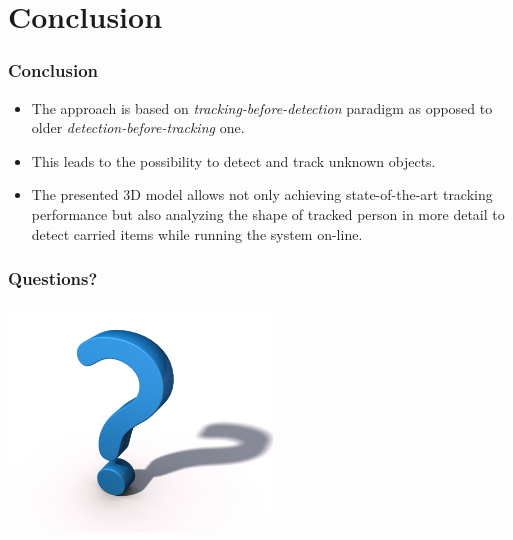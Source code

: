 \documentclass{beamer}
\begin{document}
\section{Conclusion}
\begin{frame}
\frametitle{Conclusion} 
\begin{itemize}
	\item The approach is based on \emph{tracking-before-detection} paradigm as opposed to older \emph{detection-before-tracking} one.
	\item This leads to the possibility to detect and track unknown objects.
	\item The presented 3D model allows not only achieving state-of-the-art tracking performance but also analyzing the shape of tracked person in more detail to detect carried items while running the system on-line.
\end{itemize}
\end{frame}

\begin{frame}
\frametitle{Questions?} 
\begin{center}
  	\includegraphics[width=7cm]{questions.jpg}
\end{center}
\end{frame}
\end{document}
